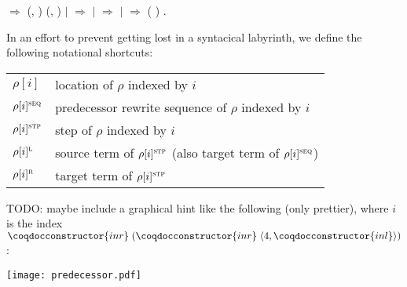 \begin{singlespace}
\begin{coqdoccode}
\ensuremath{\Rightarrow}
\coqdocvar{\_} (, )
(\coqdocvariable{$\tau$}, \coqdocvariable{$\pi$})\coqdoceol
\coqdocindent{10.00em}
\ensuremath{|}
  \ensuremath{\Rightarrow}
 \coqdocvariable{$\tau$}
\coqdoceol
\coqdocindent{10.00em}
\coqdoceol
\coqdocindent{1.00em}
\ensuremath{|}  \coqdocvar{\_}
\coqdocvar{\_} \coqdocvar{\_}  \coqdocvar{\_}
\ensuremath{\Rightarrow}
  \coqdoceol
\coqdocindent{10.00em}
\ensuremath{|}
  \ensuremath{\Rightarrow}
 (
) \coqdoceol
\coqdocindent{10.00em}
\coqdoceol
\coqdocindent{1.00em}
.\coqdoceol
\end{coqdoccode}
\end{singlespace}

In an effort to prevent getting lost in a syntacical labyrinth, we define
the following notational shortcuts:

{\renewcommand{\arraystretch}{1.1}
\renewcommand{\tabcolsep}{10pt}
\begin{tabular}{ll}
$\rho[i]$ & location of $\rho$ indexed by $i$\\
$\rho[i]^\textsc{seq}$ & predecessor rewrite sequence of $\rho$ indexed by $i$\\
$\rho[i]^\textsc{stp}$ & step of $\rho$ indexed by $i$\\
$\rho[i]^\textsc{l}$ & source term of $\rho[i]^\textsc{stp}$ (also target term
  of $\rho[i]^\textsc{seq}$)\\
$\rho[i]^\textsc{r}$ & target term of $\rho[i]^\textsc{stp}$
\end{tabular}}

TODO: maybe include a graphical hint like the following (only prettier), where
$i$ is the index $\coqdocconstructor{inr} \; (\coqdocconstructor{inr} \;
\langle 4, \coqdocconstructor{inl}\rangle)$:

\texttt{[image: predecessor.pdf]}

